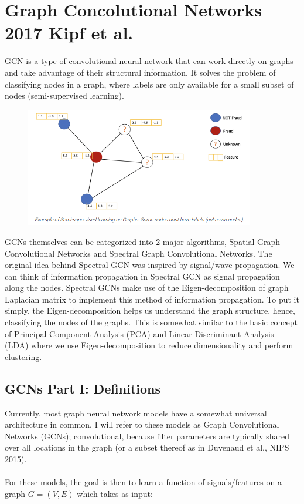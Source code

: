 \documentclass[12pt,a4paper]{article}
\begin{document}
\newpage


\section*{Graph Concolutional Networks 2017 Kipf et al. }

GCN is a type of convolutional neural network that can work directly on graphs and take advantage of their structural information. It solves the problem of classifying nodes in a graph, where labels are only available for a small subset of nodes (semi-supervised learning).

\begin{figure}[h]
\includegraphics[width=10cm]{GCN_pic_1}
\centering
\end{figure}
GCNs themselves can be categorized into 2 major algorithms, Spatial Graph Convolutional Networks and Spectral Graph Convolutional Networks. The original idea behind Spectral GCN was inspired by signal/wave propagation. We can think of information propagation in Spectral GCN as signal propagation along the nodes. Spectral GCNs make use of the Eigen-decomposition of graph Laplacian matrix to implement this method of information propagation. To put it simply, the Eigen-decomposition helps us understand the graph structure, hence, classifying the nodes of the graphs. This is somewhat similar to the basic concept of Principal Component Analysis (PCA) and Linear Discriminant Analysis (LDA) where we use Eigen-decomposition to reduce dimensionality and perform clustering. 

\subsection*{GCNs Part I: Definitions}

Currently, most graph neural network models have a somewhat universal architecture in common. I will refer to these models as Graph Convolutional Networks (GCNs); convolutional, because filter parameters are typically shared over all locations in the graph (or a subset thereof as in Duvenaud et al., NIPS 2015).
\\ \\
For these models, the goal is then to learn a function of signals/features on a graph $G=(V,E)$ which takes as input:
\end{document}
